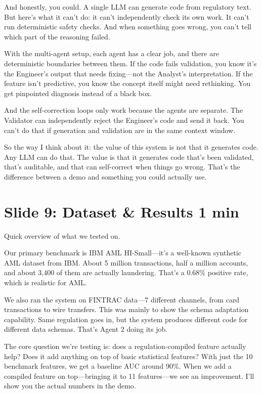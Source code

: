 \documentclass[11pt, a4paper]{article}
\newcommand{\timing}[1]{{\hfill\small\color{gray}#1}}
\begin{document}
And honestly, you could. A single LLM can generate code from regulatory text. But here's what it can't do: it can't independently check its own work. It can't run deterministic safety checks. And when something goes wrong, you can't tell which part of the reasoning failed.

With the multi-agent setup, each agent has a clear job, and there are deterministic boundaries between them. If the code fails validation, you know it's the Engineer's output that needs fixing---not the Analyst's interpretation. If the feature isn't predictive, you know the concept itself might need rethinking. You get pinpointed diagnosis instead of a black box.

And the self-correction loops only work because the agents are separate. The Validator can independently reject the Engineer's code and send it back. You can't do that if generation and validation are in the same context window.

So the way I think about it: the value of this system is not that it generates code. Any LLM can do that. The value is that it generates code that's been validated, that's auditable, and that can self-correct when things go wrong. That's the difference between a demo and something you could actually use.

\section{Slide 9: Dataset \& Results \timing{1 min}}

Quick overview of what we tested on.

Our primary benchmark is IBM AML HI-Small---it's a well-known synthetic AML dataset from IBM. About 5 million transactions, half a million accounts, and about 3,400 of them are actually laundering. That's a 0.68\% positive rate, which is realistic for AML.

We also ran the system on FINTRAC data---7 different channels, from card transactions to wire transfers. This was mainly to show the schema adaptation capability. Same regulation goes in, but the system produces different code for different data schemas. That's Agent 2 doing its job.

The core question we're testing is: does a regulation-compiled feature actually help? Does it add anything on top of basic statistical features? With just the 10 benchmark features, we get a baseline AUC around 90\%. When we add a compiled feature on top---bringing it to 11 features---we see an improvement. I'll show you the actual numbers in the demo.
\end{document}
